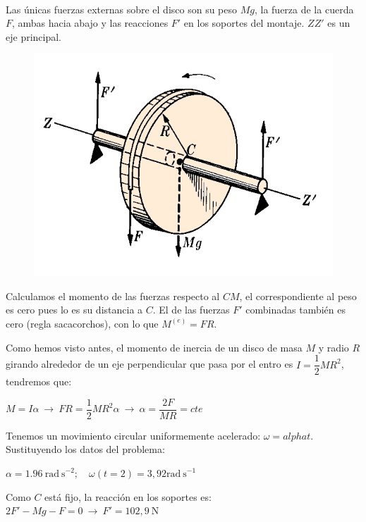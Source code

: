 \begin{multicols}{2}
$\quad$

Las únicas fuerzas externas sobre el disco son su peso $Mg$, la fuerza de la cuerda $F$, ambas hacia abajo y las reacciones $F'$ en los soportes del montaje. $ZZ'$ es un eje principal.
\begin{figure}[H]
	\centering
	\includegraphics[width=.5\textwidth]{imagenes/imagenes16/T16IM11.png}
\end{figure}
\end{multicols}



Calculamos el momento de las fuerzas respecto al $CM$, el correspondiente al peso es cero pues lo es su distancia a $C$. El de las fuerzas $F'$ combinadas también es cero (regla sacacorchos), con lo que $M^{(e)}=FR$.

Como hemos visto antes, el momento de inercia de un disco de masa $M$ y radio $R$ girando alrededor de un eje perpendicular que pasa por el entro es $I=\dfrac 1 2 MR^2$, tendremos que: 

$M=I\alpha \ \to \ FR=\dfrac 1 2 M R^2 \alpha \ \to \ \alpha=\dfrac{2F}{MR}=cte$

Tenemos un movimiento circular uniformemente acelerado: $\omega=	alpha t$. Sustituyendo los datos del problema:

$\alpha = 1.96 \ \mathrm{rad\ s}^{-2};\quad \omega (t=2)=3,92 \mathrm{rad\ s}^{-1}$

Como $C$ está fijo, la reacción en los soportes es: $2F'-Mg-F=0 \ \to \ F'=102,9\ \mathrm{N}$

